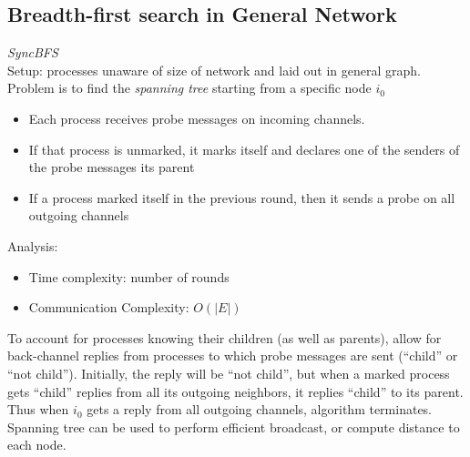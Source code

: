 \documentclass[a4paper,10pt,]{article}
\begin{document}
\subsection{Breadth-first search in General Network}
\emph{SyncBFS}\\
Setup: processes unaware of size of network and laid out in general graph. \\
Problem is to find the \emph{spanning tree} starting from a specific node $i_0$
\begin{itemize}
  \item Each process receives probe messages on incoming channels.
  \item If that process is unmarked, it marks itself and declares one of the senders of the probe messages its parent
  \item If a process marked itself in the previous round, then it sends a probe on all outgoing channels
\end{itemize}
Analysis:
\begin{itemize}
  \item Time complexity: number of rounds
  \item Communication Complexity: $O(|E|)$
\end{itemize}
To account for processes knowing their children (as well as parents), allow for back-channel replies from processes to which probe messages are sent (``child'' or ``not child'').  Initially, the reply will be ``not child'', but when a marked process gets ``child'' replies from all its outgoing neighbors, it replies ``child'' to its parent.  Thus when $i_0$ gets a reply from all outgoing channels, algorithm terminates.\\
Spanning tree can be used to perform efficient broadcast, or compute distance to each node.
\end{document}
